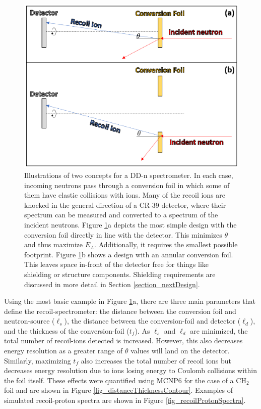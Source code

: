 \begin{figure}[h!]
	
	\centering
	\includegraphics[scale=1.5]{Figures/nonShieldedCartoon.pdf}
	\caption{Illustrations of two concepts for a DD-n spectrometer. In each case, incoming neutrons pass through a conversion foil in which some of them have elastic collisions with ions. Many of the recoil ions are knocked in the general direction of a CR-39 detector, where their spectrum can be measured and converted to a spectrum of the incident neutrons. Figure \ref{fig_nonShieldedCartoon}a depicts the most simple design with the conversion foil directly in line with the detector. This minimizes $\theta$ and thus maximize $E_A$. Additionally, it requires the smallest possible footprint. Figure \ref{fig_nonShieldedCartoon}b shows a design with an annular conversion foil. This leaves space in-front of the detector free for things like shielding or structure components. Shielding requirements are discussed in more detail in Section \ref{section_nextDesign}. }
	\label{fig_nonShieldedCartoon}
	
\end{figure}

Using the most basic example in Figure \ref{fig_nonShieldedCartoon}a, there are three main parameters that define the recoil-spectrometer: the distance between the conversion foil and neutron-source ($\ell_s$), the distance between the conversion-foil and detector ($\ell_d$), and the thickness of the conversion-foil ($t_{f}$). As $\ell_s$ and $\ell_d$ are minimized, the total number of recoil-ions detected is increased. However, this also decreases energy resolution as a greater range of $\theta$ values will land on the detector. Similarly, maximizing $t_f$ also increases the total number of recoil ions but decreases energy resolution due to ions losing energy to Coulomb collisions within the foil itself. These effects were quantified using MCNP6 \cite{MCNP6} for the case of a CH$_2$ foil and are shown in Figure \ref{fig_distanceThicknessContour}. Examples of simulated recoil-proton spectra are shown in Figure \ref{fig_recoilProtonSpectra}.

